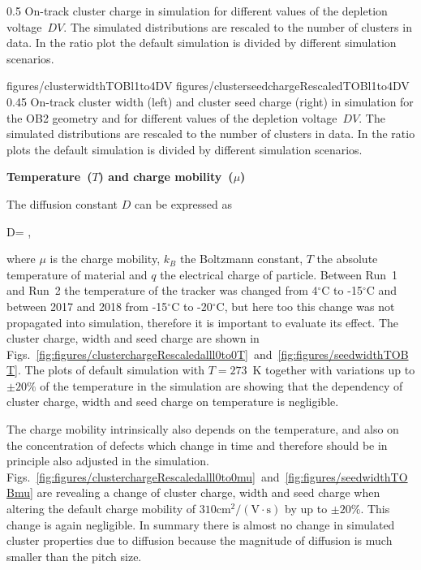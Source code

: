                  {0.5}       %
                 {  On-track cluster charge in simulation for different values of the depletion voltage~$DV$.  The simulated distributions are rescaled to the number of clusters in data. In the ratio plot the default simulation is divided by different simulation scenarios. }

                 {figures/clusterwidthTOBl1to4DV}
                 {figures/clusterseedchargeRescaledTOBl1to4DV} %
                 {0.45}       %
                 {  On-track cluster width (left) and cluster seed charge (right) in simulation  for the OB2 geometry and for different values of the depletion voltage~$DV$.  The simulated distributions are rescaled to the number of clusters in data. In the ratio plots the default simulation is divided by different simulation scenarios. }

\textbf{Temperature~($T$) and charge mobility~($\mu$)}

The diffusion constant $D$ can be expressed as

{
   D=  ,
}

where $\mu$ is the charge mobility, $k_{B}$ the Boltzmann constant, $T$ the absolute temperature of material and $q$ the electrical charge of particle. Between Run~1 and Run~2 the temperature of the tracker was changed from 4$^{\circ}$C to -15$^{\circ}$C and between 2017 and 2018 from -15$^{\circ}$C to -20$^{\circ}$C, but here too this change was not propagated into simulation, therefore it is important to evaluate its effect. The cluster charge, width and seed charge are shown in Figs.~\ref{fig:figures/clusterchargeRescaledalll0to0T}~and~\ref{fig:figures/seedwidthTOBT}. The plots of default simulation with $T=273$~K together with variations up to $\pm 20\%$ of the temperature in the simulation are showing that the dependency of cluster charge, width and seed charge on temperature is negligible. 

The charge mobility intrinsically also depends on the temperature, and also on the concentration of defects which change in time and therefore should be in principle also adjusted in the simulation. Figs.~\ref{fig:figures/clusterchargeRescaledalll0to0mu}~and~\ref{fig:figures/seedwidthTOBmu} are revealing a change of cluster charge, width and seed charge when altering the default charge mobility of $310 \mathrm{cm^2/(V \cdot s)}$ by up to $\pm 20\%$. This change is again negligible. In summary there is almost no change in simulated cluster properties due to diffusion because the magnitude of diffusion is much smaller than the pitch size.


